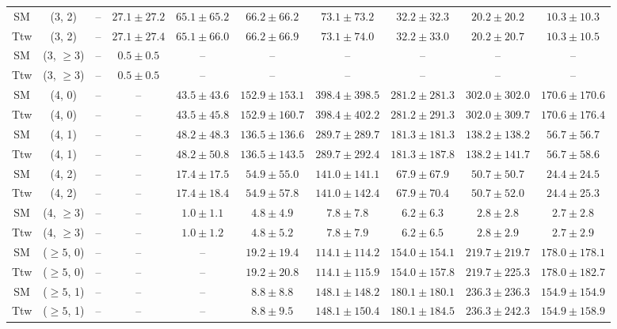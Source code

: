 \begin{table}[h!]
{\begin{tabular}{cccccccccc}
	SM & (3, 2) & -- & $27.1\pm 27.2$ & $65.1\pm 65.2$ & $66.2\pm 66.2$ & $73.1\pm 73.2$ & $32.2\pm 32.3$ & $20.2\pm 20.2$ & $10.3\pm 10.3$ \\[0.5ex] 
	Ttw & (3, 2) & -- & $27.1\pm 27.4$ & $65.1\pm 66.0$ & $66.2\pm 66.9$ & $73.1\pm 74.0$ & $32.2\pm 33.0$ & $20.2\pm 20.7$ & $10.3\pm 10.5$ \\[0.5ex] 
	SM & (3, $\ge3$) & -- & $0.5\pm 0.5$ & -- & -- & -- & -- & -- & -- \\[0.5ex] 
	Ttw & (3, $\ge3$) & -- & $0.5\pm 0.5$ & -- & -- & -- & -- & -- & -- \\[0.5ex] 
	SM & (4, 0) & -- & -- & $43.5\pm 43.6$ & $152.9\pm 153.1$ & $398.4\pm 398.5$ & $281.2\pm 281.3$ & $302.0\pm 302.0$ & $170.6\pm 170.6$ \\[0.5ex] 
	Ttw & (4, 0) & -- & -- & $43.5\pm 45.8$ & $152.9\pm 160.7$ & $398.4\pm 402.2$ & $281.2\pm 291.3$ & $302.0\pm 309.7$ & $170.6\pm 176.4$ \\[0.5ex] 
	SM & (4, 1) & -- & -- & $48.2\pm 48.3$ & $136.5\pm 136.6$ & $289.7\pm 289.7$ & $181.3\pm 181.3$ & $138.2\pm 138.2$ & $56.7\pm 56.7$ \\[0.5ex] 
	Ttw & (4, 1) & -- & -- & $48.2\pm 50.8$ & $136.5\pm 143.5$ & $289.7\pm 292.4$ & $181.3\pm 187.8$ & $138.2\pm 141.7$ & $56.7\pm 58.6$ \\[0.5ex] 
	SM & (4, 2) & -- & -- & $17.4\pm 17.5$ & $54.9\pm 55.0$ & $141.0\pm 141.1$ & $67.9\pm 67.9$ & $50.7\pm 50.7$ & $24.4\pm 24.5$ \\[0.5ex] 
	Ttw & (4, 2) & -- & -- & $17.4\pm 18.4$ & $54.9\pm 57.8$ & $141.0\pm 142.4$ & $67.9\pm 70.4$ & $50.7\pm 52.0$ & $24.4\pm 25.3$ \\[0.5ex] 
	SM & (4, $\ge3$) & -- & -- & $1.0\pm 1.1$ & $4.8\pm 4.9$ & $7.8\pm 7.8$ & $6.2\pm 6.3$ & $2.8\pm 2.8$ & $2.7\pm 2.8$ \\[0.5ex] 
	Ttw & (4, $\ge3$) & -- & -- & $1.0\pm 1.2$ & $4.8\pm 5.2$ & $7.8\pm 7.9$ & $6.2\pm 6.5$ & $2.8\pm 2.9$ & $2.7\pm 2.9$ \\[0.5ex] 
	SM & ($\ge5$, 0) & -- & -- & -- & $19.2\pm 19.4$ & $114.1\pm 114.2$ & $154.0\pm 154.1$ & $219.7\pm 219.7$ & $178.0\pm 178.1$ \\[0.5ex] 
	Ttw & ($\ge5$, 0) & -- & -- & -- & $19.2\pm 20.8$ & $114.1\pm 115.9$ & $154.0\pm 157.8$ & $219.7\pm 225.3$ & $178.0\pm 182.7$ \\[0.5ex] 
	SM & ($\ge5$, 1) & -- & -- & -- & $8.8\pm 8.8$ & $148.1\pm 148.2$ & $180.1\pm 180.1$ & $236.3\pm 236.3$ & $154.9\pm 154.9$ \\[0.5ex] 
	Ttw & ($\ge5$, 1) & -- & -- & -- & $8.8\pm 9.5$ & $148.1\pm 150.4$ & $180.1\pm 184.5$ & $236.3\pm 242.3$ & $154.9\pm 158.9$ \\[0.5ex] 

\end{tabular}}
\end{table}
